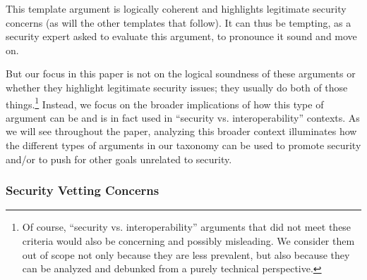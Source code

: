 \documentclass[letterpaper,twocolumn,10pt]{article}
\begin{document}
\begin{center}
\end{center}

This template argument is logically coherent and highlights legitimate security concerns (as will the other templates that follow). It can thus be tempting, as a security expert asked to evaluate this argument, to pronounce it sound and move on. 

But our focus in this paper is not on the logical soundness of these arguments or whether they highlight legitimate security issues; they usually do both of those things.\footnote{Of course, ``security vs. interoperability'' arguments that did not meet these criteria would also be concerning and possibly misleading. We consider them out of scope not only because they are less prevalent, but also because they can be analyzed and debunked from a purely technical perspective.} Instead, we focus on the broader implications of how this type of argument can be and is in fact used in ``security vs. interoperability'' contexts. As we will see throughout the paper, analyzing this broader context illuminates how the different types of arguments in our taxonomy can be used to promote security and/or to push for other goals unrelated to security.

\subsubsection{Security Vetting Concerns}
\label{sec:framework:taxonomy:vet}
\end{document}
